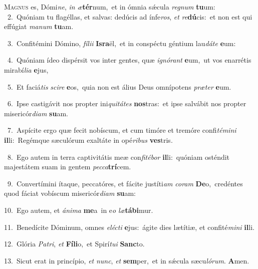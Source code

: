 \lettrine{\initial\textcolor{\initialcolor}{M}}{agnus} es, Dómi\-\textit{ne}\-, \textit{in} \textit{æ}\-\textbf{tér}num,~\star et in ómnia sǽcula \textit{re}\-\textit{gnum} \textbf{tu}\-um:\\
{\numbfont\textcolor{\numbcolor}{~2.}}~Quóniam tu flagéllas, et salvas: dedúcis ad ínfe\-\textit{ros}\-, \textit{et} \textit{re}\-\textbf{dú}cis:~\star et non est qui effúgiat \textit{ma}\-\textit{num} \textbf{tu}\-am.\par
{\numbfont\textcolor{\numbcolor}{~3.}}~Confitémini Dómino, \textit{fí}\-\textit{li}\textit{i} \textbf{Is}\-\textbf{ra}ël,~\star et in conspéctu géntium lau\-\textit{dá}\-\textit{te} \textbf{e}\-um:\par
{\numbfont\textcolor{\numbcolor}{~4.}}~Quóniam ídeo dispérsit vos inter gentes, quæ \textit{i}\-\textit{gnó}\textit{rant} \textbf{e}\-um,~\star ut vos enarrétis mirabí\-\textit{li}\-\textit{a} \textbf{e}\-jus,\par
{\numbfont\textcolor{\numbcolor}{~5.}}~Et faciá\textit{tis} \textit{sci}\-\textit{re} \textbf{e}\-os,~\star quia non est álius Deus omnípotens \textit{præ}\-\textit{ter} \textbf{e}\-um.\par
{\numbfont\textcolor{\numbcolor}{~6.}}~Ipse castigávit nos propter ini\-\textit{qui}\-\textit{tá}\textit{tes} \textbf{nos}\-tras:~\star et ipse salvábit nos propter misericór\-\textit{di}\-\textit{am} \textbf{su}\-am.\par
{\numbfont\textcolor{\numbcolor}{~7.}}~Aspícite ergo quæ fecit nobíscum, et cum timóre et tremóre confi\-\textit{té}\-\textit{mi}\textit{ni} \textbf{il}\-li:~\star Regémque sæculórum exaltáte in opé\-\textit{ri}\-\textit{bus} \textbf{ves}\-tris.\par
{\numbfont\textcolor{\numbcolor}{~8.}}~Ego autem in terra captivitátis meæ con\-\textit{fi}\-\textit{té}\textit{bor} \textbf{il}\-li:~\star quóniam osténdit majestátem suam in gentem \textit{pec}\-\textit{ca}\textbf{trí}cem.\par
{\numbfont\textcolor{\numbcolor}{~9.}}~Convertímini ítaque, peccatóres, et fácite justíti\textit{am} \textit{co}\-\textit{ram} \textbf{De}\-o,~\star credéntes quod fáciat vobíscum misericór\-\textit{di}\-\textit{am} \textbf{su}\-am:\par
{\numbfont\textcolor{\numbcolor}{10.}}~Ego autem, et \textit{á}\-\textit{ni}\textit{ma} \textbf{me}\-a~\star in e\textit{o} \textit{læ}\-\textbf{tá}\textbf{bi}mur.\par
{\numbfont\textcolor{\numbcolor}{11.}}~Benedícite Dóminum, omnes \textit{e}\-\textit{léc}\textit{ti} \textbf{e}\-jus:~\star ágite dies lætítiæ, et confité\-\textit{mi}\-\textit{ni} \textbf{il}\-li.\par
{\numbfont\textcolor{\numbcolor}{12.}}~Glória \textit{Pa}\-\textit{tri}, \textit{et} \textbf{Fí}\-\textbf{li}o,~\star et Spirí\-\textit{tu}\-\textit{i} \textbf{Sanc}\-to.\par
{\numbfont\textcolor{\numbcolor}{13.}}~Sicut erat in princípio, \textit{et} \textit{nunc}\-, \textit{et} \textbf{sem}\-per,~\star et in sǽcula sæcu\-\textit{ló}\-\textit{rum}. \textbf{A}\-men.\par
